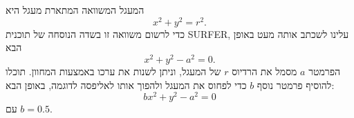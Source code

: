 \begin{surferPage}{המעגל}
המשוואה המתארת מעגל היא
\[x^2+y^2=r^2.\]
כדי לרשום משוואה זו בשדה הנוסחה של תוכנית SURFER, עלינו לשכתב אותה מעט באופן הבא
\[x^2+y^2-a^2=0.\]
הפרמטר $a$ מסמל את הרדיוס $r$ של המעגל, וניתן לשנות את ערכו באמצעות המחוון. תוכלו להוסיף פרמטר נוסף $b$ כדי לפחוס את המעגל ולהפוך אותו לאליפסה לדוגמה, באופן הבא:
\[bx^2+y^2-a^2=0\] עם $b=0.5$.
\end{surferPage}
